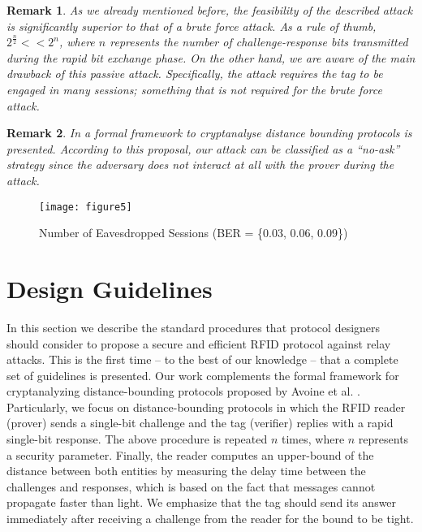 \documentclass{article}
\newtheorem{remark}{Remark}
\begin{document}
\begin{remark}
As we already mentioned before, the feasibility of the described attack is significantly superior to that of a brute force attack. As a rule of thumb, $2^{\frac{n}{2}}<<2^n$, where $n$ represents the number of challenge-response bits transmitted during the rapid bit exchange phase. On the other hand,  we are aware of the main drawback of this passive attack.  Specifically,  the attack requires the tag to be engaged in many sessions; something that is not required for the brute force attack.
\end{remark}

\begin{remark}
In \cite{AvoineBKLM-2009-eprint} a formal framework to cryptanalyse distance bounding protocols is presented. According to this proposal, our attack can be classified as a ``no-ask'' strategy since the adversary does not interact at all with the prover during the attack.
\end{remark}

\begin{figure}
\centering
\texttt{[image: figure5]}\\
  \caption{Number of Eavesdropped Sessions (BER = \{0.03, 0.06, 0.09\})}\label{fig::fig6}
\end{figure}


\section{Design Guidelines}\label{sec::guidelines}

In this section we describe the standard procedures that protocol designers should consider to propose a secure and efficient RFID protocol against relay attacks. This is the first time -- to the best of our knowledge -- that a complete set of guidelines is presented. Our work complements the formal framework for cryptanalyzing distance-bounding protocols proposed by Avoine et al. \cite{AvoineBKLM-2009-eprint}.  Particularly, we focus on distance-bounding protocols in which the RFID reader (prover) sends a single-bit challenge and the tag (verifier) replies with a rapid single-bit response. The above procedure is repeated $n$ times, where $n$ represents a security parameter.  Finally, the reader computes an upper-bound of the distance between both entities by measuring the delay time between the challenges and responses, which is based on the fact that messages cannot propagate faster than light. We emphasize that the tag should send its answer immediately after receiving a challenge from the reader for the bound to be tight.
\end{document}
